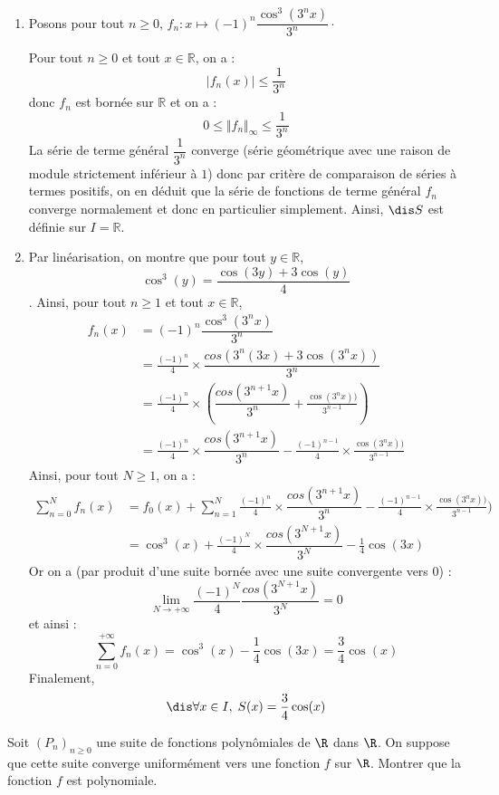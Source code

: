 \documentclass[a4paper,10pt]{report}
\begin{document}
\corr \begin{enumerate}
\item Posons pour tout $n \geq 0$, $f_n : x \mapsto (-1)^n \dfrac{\cos^3(3^nx)}{3^n} \cdot$

\medskip

\noindent Pour tout $n \geq 0$ et tout $x \in \mathbb{R}$, on a :
$$ \vert f_n(x) \vert \leq \frac{1}{3^n}$$
donc $f_n$ est bornée sur $\mathbb{R}$ et on a :
$$ 0 \leq \Vert f_n \Vert_{\infty} \leq \frac{1}{3^n}$$
La série de terme général $\dfrac{1}{3^n}$ converge (série géométrique avec une raison de module strictement inférieur à $1$) donc par critère de comparaison de séries à termes positifs, on en déduit que la série de fonctions de terme général $f_n$ converge normalement et donc en particulier simplement. Ainsi, $\dis S$ est définie sur $I = \mathbb{R}$.
\item Par linéarisation, on montre que pour tout $y \in \mathbb{R}$,
$$ \cos^3(y) = \frac{\cos(3y)+3\cos(y)}{4}$$.
Ainsi, pour tout $n \geq 1$ et tout $x \in \mathbb{R}$,
\begin{align*}
f_n(x)& = (-1)^n \dfrac{\cos^3(3^nx)}{3^n} \\
& = \frac{(-1)^n}{4} \times  \dfrac{cos(3^n(3x)+3\cos(3^nx))}{3^n}  \\
& = \frac{(-1)^n}{4} \times  \left(\dfrac{cos(3^{n+1} x)}{3^n}+\frac{\cos(3^nx))}{3^{n-1}} \right) \\
& = \frac{(-1)^n}{4} \times\dfrac{cos(3^{n+1} x)}{3^n}- \frac{(-1)^{n-1}}{4} \times\frac{\cos(3^nx))}{3^{n-1}} 
\end{align*}
Ainsi, pour tout $N \geq 1$, on a :
\begin{align*}
\sum_{n=0}^{N} f_n(x) & = f_0(x) + \sum_{n=1}^{N} \frac{(-1)^n}{4} \times\dfrac{cos(3^{n+1} x)}{3^n}- \frac{(-1)^{n-1}}{4} \times\frac{\cos(3^nx))}{3^{n-1}})  \\
& = \cos^3(x) + \frac{(-1)^N}{4} \times\dfrac{cos(3^{N+1} x)}{3^N} - \frac{1}{4} \cos(3x)     
\end{align*}
Or on a (par produit d'une suite bornée avec une suite convergente vers $0$) :
$$ \lim_{N \rightarrow + \infty} \frac{(-1)^N}{4} \dfrac{cos(3^{N+1} x)}{3^N} = 0$$
et ainsi :
$$ \sum_{n=0}^{+\infty} f_n(x)  = \cos^3(x) - \frac{1}{4} \cos(3x) = \frac{3}{4} \cos(x)$$
Finalement,
$$\dis \forall x \in I, \; S(x)= \dfrac{3}{4}\cos(x)$$
\end{enumerate}

\begin{Exercice}{} Soit $(P_{n})_{n \geq 0}$ une suite de fonctions polynômiales de $\R$ dans $\R$. On suppose que cette suite converge uniformément vers une fonction $f$ sur $\R$. Montrer que la fonction $f$ est polynomiale.
\end{Exercice}
\end{document}
